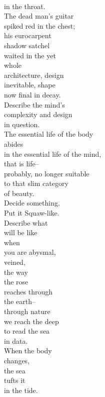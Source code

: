 \documentclass[smalldemyvopaper,11pt,twoside,onecolumn,openright,extrafontsizes]{memoir}
\begin{document}
\\in the throat.
\\The dead man's guitar
\\spiked red in the chest;
\\his eurocarpent
\\shadow satchel
\\waited in the yet
\\whole
\\architecture, design
\\inevitable, shape
\\now final in decay.
\\Describe the mind's
\\complexity and design
\\in question.
\\The essential life of the body
\\abides
\\in the essential life of the mind,
\\that is life--
\\probably, no longer suitable
\\to that slim category
\\of beauty.
\\Decide something.
\\Put it Squaw-like.
\\Describe what
\\will be like
\\when
\\you are abysmal,
\\veined,
\\the way
\\the rose
\\reaches through
\\the earth--
\\through nature
\\we reach the deep
\\to read the sea
\\in data.
\\When the body
\\changes,
\\the sea
\\tufts it
\\in the tide.
\end{document}
